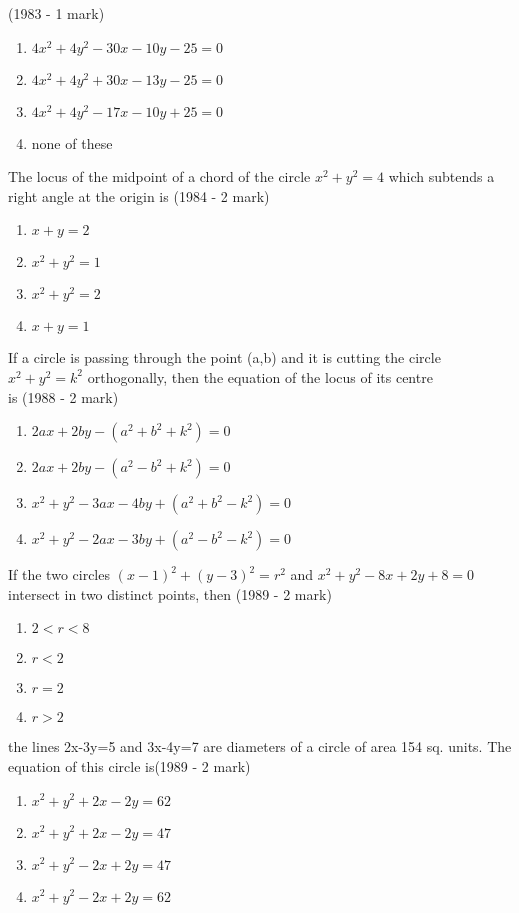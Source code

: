     \hfill {(1983 - 1 mark)}
    \begin{enumerate}
    \item $4x^{2}+4y^{2}-30x-10y-25=0$
    \item $4x^{2}+4y^{2}+30x-13y-25=0$
    \item $4x^{2}+4y^{2}-17x-10y+25=0$
    \item none of these
    \end{enumerate}
    \item The locus of the midpoint of a chord of the circle $x^{2}+y^{2}=4$ which subtends a right angle at the origin is \hfill {(1984 - 2 mark)}
    \begin{enumerate}
    \item $x+y=2$
    \item $x^{2}+y^{2}=1$
    \item $x^{2}+y^{2}=2$
    \item $x+y=1$
    \end{enumerate}
    \item If a circle is passing through the point (a,b) and it is cutting the circle $x^{2}+y^{2}=k^{2}$ orthogonally, then the equation of the locus of its centre \\ is 
    \hfill {(1988 - 2 mark)}
    \begin{enumerate}
    \item $2ax + 2by - (a^{2}+b^{2}+k^{2}) = 0$
    \item $2ax + 2by - (a^{2}-b^{2}+k^{2}) = 0$
    \item $x^{2} + y^{2}-3ax-4by+ (a^{2}+b^{2}-k^{2}) = 0$
    \item $x^{2} + y^{2}-2ax-3by+ (a^{2}-b^{2}-k^{2}) = 0$
    \end{enumerate}
    \item If the two circles $(x-1)^{2} + (y-3)^{2} = r^{2}$ and $x^{2}+y^{2}-8x+2y+8=0$ intersect in two distinct points, then \hfill {(1989 - 2 mark)} 
    \begin{enumerate}
    \item $2<r<8$
    \item $r<2$
    \item $r=2$
    \item $r>2$
    \end{enumerate}
    \item the lines 2x-3y=5 and 3x-4y=7 are diameters of a circle of area 154 sq. units. The equation of this circle is\hfill {(1989 - 2 mark)}
    \begin{enumerate}
    \item $x^{2}+y^{2}+2x-2y=62$
    \item $x^{2}+y^{2}+2x-2y=47$
    \item $x^{2}+y^{2}-2x+2y=47$
    \item $x^{2}+y^{2}-2x+2y=62$
    \end{enumerate}
